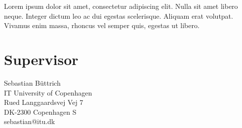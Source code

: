 \documentclass{ubicomp2012}
\begin{document}
Lorem ipsum dolor sit amet, consectetur adipiscing elit. Nulla sit amet libero neque. Integer dictum leo ac dui egestas scelerisque. Aliquam erat volutpat. Vivamus enim massa, rhoncus vel semper quis, egestas ut libero.

\section{Supervisor}
Sebastian B\"uttrich\\
IT University of Copenhagen\\
Rued Langgaardsvej Vej 7\\
DK-2300 Copenhagen S\\
sebastian@itu.dk

\nocite{example-journal,example-abstracts,example-conference2}



\end{document}
